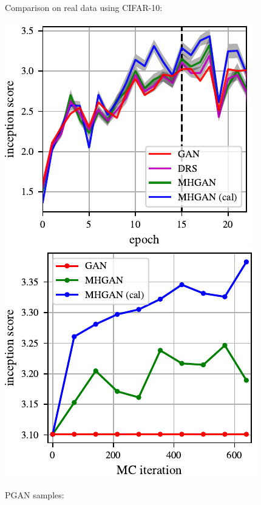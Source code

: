 \documentclass[a0,landscape]{a0poster}
\begin{document}
\begin{multicols}{3}
\begin{center}
\end{center}

\columnbreak

Comparison on real data using CIFAR-10:
\begin{center}
\includegraphics[scale=2.5]{../figures/per_epoch.pdf}
\includegraphics[scale=2.5]{../figures/plot_per_mh.pdf}
\end{center}

PGAN samples:

\setlength{\fboxrule}{5pt}


\end{multicols}
\end{document}
